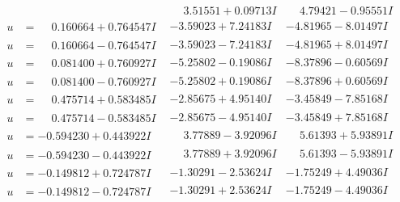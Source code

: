 \documentclass[1p]{elsarticle_modified}
\theoremstyle{definition}
\begin{document}
$$\begin{array}{c|c|c}
 & \phantom{-}3.51551 + 0.09713 I & \phantom{-}4.79421 - 0.95551 I \\ \hline\begin{aligned}
u &= \phantom{-}0.160664 + 0.764547 I\end{aligned}
 & -3.59023 + 7.24183 I & -4.81965 - 8.01497 I \\ \hline\begin{aligned}
u &= \phantom{-}0.160664 - 0.764547 I\end{aligned}
 & -3.59023 - 7.24183 I & -4.81965 + 8.01497 I \\ \hline\begin{aligned}
u &= \phantom{-}0.081400 + 0.760927 I\end{aligned}
 & -5.25802 - 0.19086 I & -8.37896 - 0.60569 I \\ \hline\begin{aligned}
u &= \phantom{-}0.081400 - 0.760927 I\end{aligned}
 & -5.25802 + 0.19086 I & -8.37896 + 0.60569 I \\ \hline\begin{aligned}
u &= \phantom{-}0.475714 + 0.583485 I\end{aligned}
 & -2.85675 + 4.95140 I & -3.45849 - 7.85168 I \\ \hline\begin{aligned}
u &= \phantom{-}0.475714 - 0.583485 I\end{aligned}
 & -2.85675 - 4.95140 I & -3.45849 + 7.85168 I \\ \hline\begin{aligned}
u &= -0.594230 + 0.443922 I\end{aligned}
 & \phantom{-}3.77889 - 3.92096 I & \phantom{-}5.61393 + 5.93891 I \\ \hline\begin{aligned}
u &= -0.594230 - 0.443922 I\end{aligned}
 & \phantom{-}3.77889 + 3.92096 I & \phantom{-}5.61393 - 5.93891 I \\ \hline\begin{aligned}
u &= -0.149812 + 0.724787 I\end{aligned}
 & -1.30291 - 2.53624 I & -1.75249 + 4.49036 I \\ \hline\begin{aligned}
u &= -0.149812 - 0.724787 I\end{aligned}
 & -1.30291 + 2.53624 I & -1.75249 - 4.49036 I \\ \hline\begin{aligned}

\end{aligned}
\end{array}$$
\end{document}
